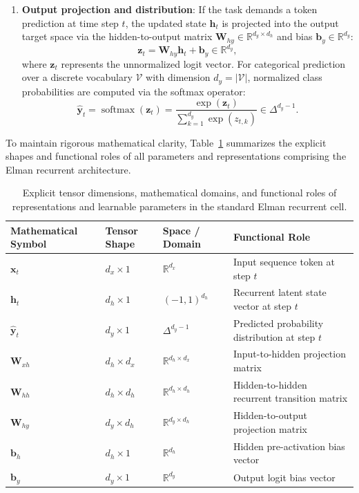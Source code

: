 \documentclass[../../../main.tex]{subfiles}
\begin{document}
\begin{enumerate}
    \item \textbf{Output projection and distribution}: If the task demands a token prediction at time step $t$, the updated state $\mathbf{h}_t$ is projected into the output target space via the hidden-to-output matrix $\mathbf{W}_{hy} \in \mathbb{R}^{d_y \times d_h}$ and bias $\mathbf{b}_y \in \mathbb{R}^{d_y}$:
    \begin{equation}
    \mathbf{z}_t = \mathbf{W}_{hy} \mathbf{h}_t + \mathbf{b}_y \in \mathbb{R}^{d_y},
    \label{eq:rnn_logits}
    \end{equation}
    where $\mathbf{z}_t$ represents the unnormalized logit vector. For categorical prediction over a discrete vocabulary $\mathcal{V}$ with dimension $d_y = |\mathcal{V}|$, normalized class probabilities are computed via the softmax operator:
    \begin{equation}
    \hat{\mathbf{y}}_t = \operatorname{softmax}\left(\mathbf{z}_t\right) = \frac{\exp\left(\mathbf{z}_t\right)}{\sum_{k=1}^{d_y} \exp\left(z_{t, k}\right)} \in \Delta^{d_y - 1}.
    \label{eq:rnn_softmax_output}
    \end{equation}
\end{enumerate}

To maintain rigorous mathematical clarity, Table~\ref{tab:rnn_tensor_dimensions} summarizes the explicit shapes and functional roles of all parameters and representations comprising the Elman recurrent architecture.

\begin{table}[htbp]
\centering
\small
\begin{tabularx}{\textwidth}{l l l X}
\toprule
\textbf{Mathematical Symbol} & \textbf{Tensor Shape} & \textbf{Space / Domain} & \textbf{Functional Role} \\
\midrule
$\mathbf{x}_t$ & $d_x \times 1$ & $\mathbb{R}^{d_x}$ & Input sequence token at step $t$ \\
$\mathbf{h}_t$ & $d_h \times 1$ & $(-1, 1)^{d_h}$ & Recurrent latent state vector at step $t$ \\
$\hat{\mathbf{y}}_t$ & $d_y \times 1$ & $\Delta^{d_y-1}$ & Predicted probability distribution at step $t$ \\
$\mathbf{W}_{xh}$ & $d_h \times d_x$ & $\mathbb{R}^{d_h \times d_x}$ & Input-to-hidden projection matrix \\
$\mathbf{W}_{hh}$ & $d_h \times d_h$ & $\mathbb{R}^{d_h \times d_h}$ & Hidden-to-hidden recurrent transition matrix \\
$\mathbf{W}_{hy}$ & $d_y \times d_h$ & $\mathbb{R}^{d_y \times d_h}$ & Hidden-to-output projection matrix \\
$\mathbf{b}_h$ & $d_h \times 1$ & $\mathbb{R}^{d_h}$ & Hidden pre-activation bias vector \\
$\mathbf{b}_y$ & $d_y \times 1$ & $\mathbb{R}^{d_y}$ & Output logit bias vector \\
\bottomrule
\end{tabularx}
\caption{Explicit tensor dimensions, mathematical domains, and functional roles of representations and learnable parameters in the standard Elman recurrent cell.}
\label{tab:rnn_tensor_dimensions}
\end{table}
\end{document}

